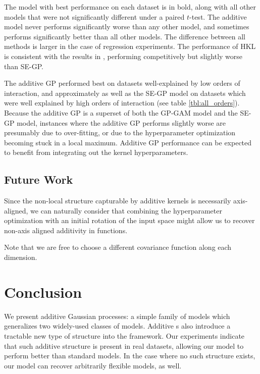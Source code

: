 The model with best performance on each dataset is in bold, along with all other models that were not significantly different under a paired $t$-test.
The additive model never performs significantly worse than any other model, and sometimes performs significantly better than all other models.  The difference between all methods is larger in the case of regression experiments. The performance of HKL is consistent with the results in \cite{DBLP:journals/corr/abs-0909-0844}, performing competitively but slightly worse than SE-GP.%

The additive GP performed best on datasets well-explained by low orders of interaction, and approximately as well as the SE-GP model on datasets which were well explained by high orders of interaction (see table \ref{tbl:all_orders}).
Because the additive GP is a superset of both the GP-GAM model and the SE-GP model, instances where the additive GP performs slightly worse are presumably due to over-fitting, or due to the hyperparameter optimization becoming stuck in a local maximum. %
Additive GP performance can be expected to benefit from integrating out the kernel hyperparameters.



\subsection{Future Work}
Since the non-local structure capturable by additive kernels is necessarily axis-aligned, we can naturally consider that combining the hyperparameter optimization with an initial rotation of the input space might allow us to recover non-axis aligned additivity in functions.

Note that we are free to choose a different covariance function along each dimension.


\section{Conclusion}

We present additive Gaussian processes: a simple family of models which generalizes two widely-used classes of models.
Additive \gp{}s also introduce a tractable new type of structure into the \gp{} framework.
Our experiments indicate that such additive structure is present in real datasets, allowing our model to perform better than standard \gp{} models.
In the case where no such structure exists, our model can recover arbitrarily flexible models, as well.

